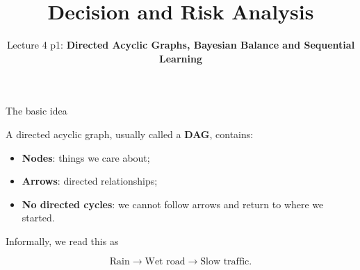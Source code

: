 \documentclass[aspectratio=43,11pt]{beamer}
\title{Decision and Risk Analysis}
\subtitle{Lecture 4 p1: \textbf{Directed Acyclic Graphs, Bayesian Balance and Sequential Learning}}
\author{\emph{}}
\date{\color{aggiemaroon}{
DAEN 427 / ISEN 427 / ISEN 627\\
\textbf{Alexander Abuabara}\\
Fall 2026
}}
\begin{document}

\begin{frame}
  \titlepage
\end{frame}

\begin{frame}{The basic idea}

A \alert{directed acyclic graph}, usually called a \textbf{DAG},
contains:

\begin{itemize}
  \item \textbf{Nodes}: things we care about;
  \item \textbf{Arrows}: directed relationships;
  \item \textbf{No directed cycles}: we cannot follow arrows and return
        to where we started.
\end{itemize}

\medskip

\begin{center}
\end{center}

\medskip

Informally, we read this as

\[
\text{Rain}
\longrightarrow
\text{Wet road}
\longrightarrow
\text{Slow traffic}.
\]

\end{frame}
\end{document}

